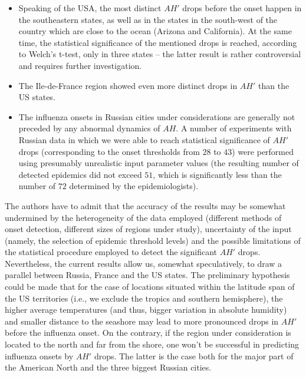 \documentclass[procedia]{easychair}
\begin{document}
\begin{itemize}
\item Speaking of the USA, the most distinct $AH'$ drops before the onset happen in the southeastern states, as well as in the states in the south-west of the country which are close to the ocean (Arizona and California). At the same time, the statistical significance of the mentioned drops is reached, according to Welch's t-test, only in three states -- the latter result is rather controversial and requires further investigation.

\item The Ile-de-France region showed even more distinct drops in $AH'$ than the US states.

\item The influenza onsets in Russian cities under considerations are generally not preceded by any abnormal dynamics of $AH$. A number of experiments with Russian data in which we were able to reach statistical significance of $AH'$ drops (corresponding to the onset thresholds from $28$ to $43$) were performed using presumably unrealistic input parameter values (the resulting number of detected epidemics did not exceed $51$, which is significantly less than the number of $72$ determined by the epidemiologists).
\end{itemize}

The authors have to admit that the accuracy of the results may be somewhat undermined by the heterogeneity of the data employed (different methods of onset detection, different sizes of regions under study), uncertainty of the input (namely, the selection of epidemic threshold levels) and the possible limitations of the statistical procedure employed to detect the significant $AH'$ drops. Nevertheless, the current results allow us, somewhat speculatively, to draw a parallel between Russia, France and the US states. The preliminary hypothesis could be made that for the case of locations situated within the latitude span of the US territories (i.e., we exclude the tropics and southern hemisphere), the higher average temperatures (and thus, bigger variation in absolute humidity) and smaller distance to the seashore may lead to more pronounced drops in $AH'$ before the influenza onset. On the contrary, if the region under consideration is located to the north and far from the shore, one won't be successful in predicting influenza onsets by $AH'$ drops. The latter is the case both for the major part of the American North and the three biggest Russian cities.
\end{document}
